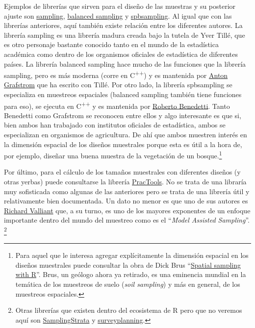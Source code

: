 \documentclass[
  spanish,
  a4paper,
]{scrreprt}
\begin{document}
Ejemplos de librerías que sirven para el diseño de las muestras y su
posterior ajuste son
\href{https://cran.r-project.org/web/packages/sampling/index.html}{sampling},
\href{https://envisim.se/balancedsampling}{balanced sampling} y
\href{https://cran.r-project.org/web/packages/Spbsampling/index.html}{spbsampling}.
Al igual que con las librerías anteriores, aquí también existe relación
entre los diferentes autores. La librería sampling es una librería
madura creada bajo la tutela de Yver Tillé, que es otro personaje
bastante conocido tanto en el mundo de la estadística académica como
dentro de los organismos oficiales de estadística de diferentes países.
La librería balanced sampling hace mucho de las funciones que la
librería sampling, pero es más moderna (corre en C\textsuperscript{++})
y es mantenida por
\href{https://scholar.google.com/citations?user=JkMAOUEAAAAJ&hl=sv}{Anton
Grafstrom} que ha escrito con Tillé. Por otro lado, la librería
spbsampling se especializa en muestreos espaciales (balanced sampling
también tiene funciones para eso), se ejecuta en C\textsuperscript{++} y
es mantenida por
\href{https://scholar.google.com/citations?user=h_Rnt4kAAAAJ&hl=it}{Roberto
Benedetti}. Tanto Benedetti como Grafstrom se reconocen entre ellos y
algo interesante es que si, bien ambos han trabajado con institutos
oficiales de estadística, ambos se especializan en organismos de
agricultura. De ahí que ambos muestren interés en la dimensión espacial
de los diseños muestrales porque esta es útil a la hora de, por ejemplo,
diseñar una buena muestra de la vegetación de un bosque.\footnote{Para
  aquel que le interesa agregar explícitamente la dimensión espacial en
  los diseños muestrales puede consultar la obra de Dick Brus
  ``\href{https://dickbrus.github.io/SpatialSamplingwithR/}{Spatial
  sampling with R}''. Brus, un geólogo ahora ya retirado, es una
  eminencia mundial en la temática de los muestreos de suelo (\emph{soil
  sampling}) y más en general, de los muestreos espaciales.}

Por último, para el cálculo de los tamaños muestrales con diferentes
diseños (y otras yerbas) puede consultarse la librería
\href{https://cran.r-project.org/web/packages/PracTools/index.html}{PracTools}.
No se trata de una libraría muy sofisticada como algunas de las
anteriores pero se trata de una librería útil y relativamente bien
documentada. Un dato no menor es que uno de sus autores es
\href{https://scholar.google.com/citations?user=6Q5RKeAAAAAJ&hl=en}{Richard
Valliant} que, a su turno, es uno de los mayores exponentes de un
enfoque importante dentro del mundo del muestreo como es el
``\emph{Model Assisted Sampling}''. \footnote{Otras librerías que
  existen dentro del ecosistema de R pero que no veremos aquí son
  \href{https://barcaroli.github.io/SamplingStrata/}{SamplingStrata} y
  \href{https://csblatvia.github.io/surveyplanning/}{surveyplanning}.}
\end{document}
